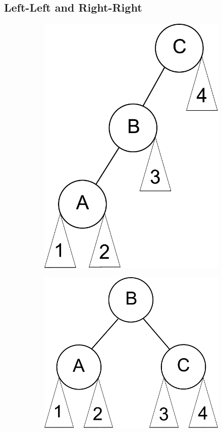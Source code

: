 \subsection*{Left-Left and Right-Right}
\begin{figure}[h]
\centering
\begin{subfigure}[b]{.49\textwidth}
    \centering
    \includegraphics[width=.75\textwidth]{left_left.pdf}
\end{subfigure}
\begin{subfigure}[b]{.49\textwidth}
    \centering
    \includegraphics[width=.75\textwidth]{balanced.pdf}
\end{subfigure}
\end{figure}


